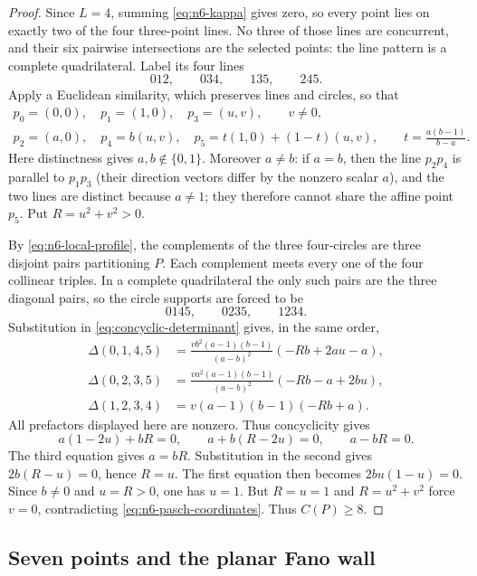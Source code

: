 \begin{proof}
Since $L=4$, summing \eqref{eq:n6-kappa} gives zero, so every point lies on
exactly two of the four three-point lines.  No three of those lines are
concurrent, and their six pairwise intersections are the selected points:
the line pattern is a complete quadrilateral.  Label its four lines
\[
 012,\qquad034,\qquad135,\qquad245.
\]
Apply a Euclidean similarity, which preserves lines and circles, so that
\begin{equation}\label{eq:n6-pasch-coordinates}
\begin{gathered}
p_0=(0,0),\quad p_1=(1,0),\quad p_3=(u,v),\qquad v\ne0,\\
p_2=(a,0),\quad p_4=b(u,v),\quad
p_5=t(1,0)+(1-t)(u,v),\qquad
t=\frac{a(b-1)}{b-a}.
\end{gathered}
\end{equation}
Here distinctness gives $a,b\notin\{0,1\}$.  Moreover $a\neq b$: if
$a=b$, then the line $p_2p_4$ is parallel to $p_1p_3$ (their direction
vectors differ by the nonzero scalar $a$), and the two lines are distinct
because $a\neq1$; they therefore cannot share the affine point $p_5$.
Put
$R=u^2+v^2>0$.

By \eqref{eq:n6-local-profile}, the complements of the three four-circles
are three disjoint pairs partitioning $P$.  Each complement meets every one
of the four collinear triples.  In a complete quadrilateral the only such
pairs are the three diagonal pairs, so the circle supports are forced to be
\[
 0145,\qquad0235,\qquad1234.
\]
Substitution in \eqref{eq:concyclic-determinant} gives, in the same order,
\[
\begin{split}
 \Delta(0,1,4,5)
  &=\frac{vb^2(a-1)(b-1)}{(a-b)^2}(-Rb+2au-a),\\
 \Delta(0,2,3,5)
  &=\frac{va^2(a-1)(b-1)}{(a-b)^2}(-Rb-a+2bu),\\
 \Delta(1,2,3,4)
  &=v(a-1)(b-1)(-Rb+a).
\end{split}
\]
All prefactors displayed here are nonzero.  Thus concyclicity gives
\[
 a(1-2u)+bR=0,\qquad
 a+b(R-2u)=0,\qquad
 a-bR=0.
\]
The third equation gives $a=bR$.  Substitution in the second gives
$2b(R-u)=0$, hence $R=u$.  The first equation then becomes
$2bu(1-u)=0$.  Since $b\ne0$ and $u=R>0$, one has $u=1$.
But $R=u=1$ and $R=u^2+v^2$ force $v=0$, contradicting
\eqref{eq:n6-pasch-coordinates}.  Thus $C(P)\geq8$.
\end{proof}

\subsection{Seven points and the planar Fano wall}

